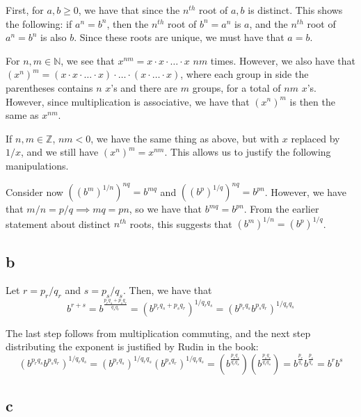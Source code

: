 \documentclass[12pt,letterpaper]{article}
\theoremstyle{definition}
\newcommand{\Z}{\mathbb{Z}}
\newcommand{\N}{\mathbb{N}}
\begin{document}

First, for $a,b \geq 0$, we have that since the $n^{th}$ root of $a,b$ is
distinct. This shows the following: if $a^n = b^n$, then the $n^{th}$ root of 
$b^n = a^n$ is $a$, and the $n^{th}$ root of $a^n = b^n$ is also $b$. Since these roots are
unique, we must have that $a = b$.

For $n, m \in \N$, we see that $x^{nm} = x \cdot x \cdot \dots \cdot x$ $nm$
times. However, we also have that $(x^n)^m = (x \cdot x \cdot \dots \cdot x)
\cdot \dots \cdot (x \cdot \dots \cdot x)$, where each group in side the
parentheses contains $n$ $x$'s and there are $m$ groups, for a total of $nm$
$x$'s. However, since multiplication is associative, we have that $(x^n)^m$ is
then the same as $x^{nm}$.

If $n,m \in \Z$, $nm < 0$, we have the same thing as above, but with $x$
replaced by $1 / x$, and we still have $(x^n)^m = x^{nm}$. This allows us to justify the following
manipulations.

Consider now $((b^m)^{1 / n})^{nq} = b^{mq}$ and $((b^p)^{1 / q})^{nq} =
b^{pn}$. However, we have that $m / n = p / q \implies mq = pn$, so we have that
$b^{mq} = b^{pn}$. From the earlier statement about distinct $n^{th}$ roots,
this suggests that $(b^m)^{1 / n} = (b^p)^{1 / q}$.

\subsection*{b}

Let $r = p_r / q_r$ and $s = p_s / q_s$. Then, we have that
\[
  b^{r + s} = b^{\frac{p_rq_s + p_sq_r}{q_sq_r}} = (b^{p_rq_s + p_sq_r})^{1 /
  q_rq_s} = (b^{p_rq_s}b^{p_sq_r})^{1 / q_rq_s}
\]

The last step follows from multiplication commuting, and the next step
distributing the exponent is
justified by Rudin in the book:
\[
  (b^{p_rq_s}b^{p_sq_r})^{1 / q_rq_s} = (b^{p_rq_s})^{1 / q_rq_s}(b^{p_sq_r})^{1
  / q_rq_s} = (b^{\frac{p_rq_s}{q_rq_s}})(b^{\frac{p_sq_r}{q_rq_s}}) =
  b^{\frac{p_r}{q_r}}b^{\frac{p_s}{q_s}} = b^rb^s
\]

\subsection*{c}
\end{document}
